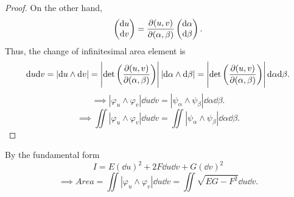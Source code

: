 \begin{enumerate}[(1)]
\begin{proof}
    On the other hand,
    \[
        \begin{pmatrix}
            \dd u\\ \dd v
        \end{pmatrix}
        =\pdv{(u,v)}{(\alpha,\beta)}\begin{pmatrix}
            \dd \alpha\\
            \dd \beta
        \end{pmatrix} .
    \]
    Thus, the change of infinitesimal area element is
    \[
        \dd u\dd v=\left|\dd u\wedge\dd v\right|=
        \left|\det \left(\pdv{(u,v)}{(\alpha,\beta)}\right)\right|
        \left|\dd\alpha\wedge\dd\beta\right|=
        \left|\det \left(\pdv{(u,v)}{(\alpha,\beta)}\right)\right|
        \dd\alpha\dd\beta.
    \]
    \[\implies \left|\varphi_u\wedge \varphi_v \right|
        \dd u\dd v=\left|\psi_\alpha\wedge\psi_\beta\right|\dd \alpha
        \dd \beta.
    \]
    \[\implies \iint \left|\varphi_u\wedge \varphi_v \right|
    \dd u\dd v=\iint \left|\psi_\alpha\wedge\psi_\beta\right|\dd \alpha
    \dd \beta.\]
\end{proof}
\begin{remark}
    By the  fundamental form 
    \[
        I=E(\dd u)^2+2F \dd u\dd v+G(\dd v)^2    
    \]
    \[\implies Area=\iint \left|\varphi_u\wedge \varphi_v \right|
    \dd u\dd v=\iint \sqrt{EG-F^2}\dd u\dd v.\]
\end{remark}
\end{enumerate}
